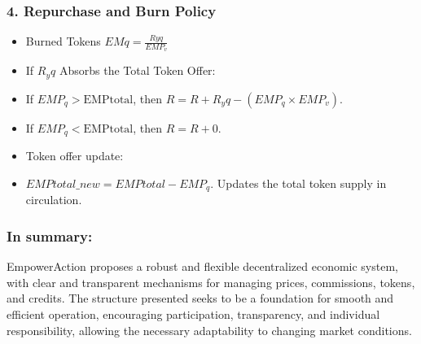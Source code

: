 \documentclass{article}
\begin{document}
\subsubsection*{4. Repurchase and Burn Policy}
\begin{itemize}
    \item Burned Tokens \(EMq = \frac{Ryq}{EMP_v}\)
    \item If \(R_yq\) Absorbs the Total Token Offer:
    \item If \(EMP_q > \text{EMPtotal}\), then \(R = R + R_yq - (EMP_q \times EMP_v)\).
    \item If \(EMP_q < \text{EMPtotal}\), then \(R = R + 0\).
    \item Token offer update:
    \item \(EMPtotal\_new = EMPtotal - EMP_q\). Updates the total token supply in circulation.
\end{itemize}

\subsubsection*{In summary:}
EmpowerAction proposes a robust and flexible decentralized economic system, with clear and transparent mechanisms for managing prices, commissions, tokens, and credits. The structure presented seeks to be a foundation for smooth and efficient operation, encouraging participation, transparency, and individual responsibility, allowing the necessary adaptability to changing market conditions.
\end{document}
